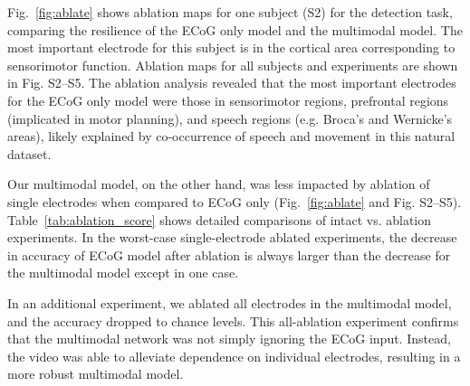 \documentclass[letterpaper]{article} %
\begin{document}
Fig.~\ref{fig:ablate} shows ablation maps for one subject (S2) for the detection task, comparing the resilience of the ECoG only model and the multimodal model. The most important electrode for this subject is in the cortical area corresponding to sensorimotor function. Ablation maps for all subjects and experiments are shown in Fig. S2--S5. The ablation analysis revealed that the most important electrodes for the ECoG only model were those in sensorimotor regions, prefrontal regions (implicated in motor planning), and speech regions (e.g. Broca's and Wernicke's areas), likely explained by co-occurrence of speech and movement in this natural dataset. 

Our multimodal model, on the other hand, was less impacted by ablation of single electrodes when compared to ECoG only (Fig.~\ref{fig:ablate} and Fig. S2--S5). Table~\ref{tab:ablation_score} shows detailed comparisons of intact vs. ablation experiments. In the worst-case single-electrode ablated experiments, the decrease in accuracy of ECoG model after ablation is always larger than the decrease for the multimodal model except in one case. 

In an additional experiment, we ablated all electrodes in the multimodal model, and the accuracy dropped to chance levels. This all-ablation experiment confirms that the multimodal network was not simply ignoring the ECoG input. Instead, the video was able to alleviate dependence on individual electrodes, resulting in a more robust multimodal model. 
\end{document}
